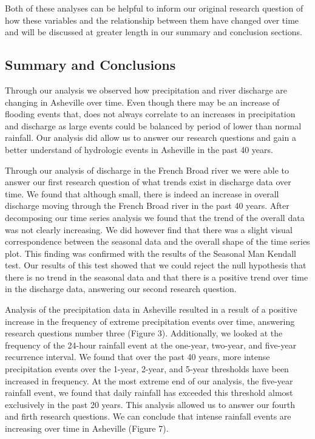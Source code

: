 \documentclass[
]{article}
\begin{document}
Both of these analyses can be helpful to inform our original research
question of how these variables and the relationship between them have
changed over time and will be discussed at greater length in our summary
and conclusion sections.

\newpage

\hypertarget{summary-and-conclusions}{%
\subsection{\texorpdfstring{\textbf{Summary and
Conclusions}}{Summary and Conclusions}}\label{summary-and-conclusions}}

Through our analysis we observed how precipitation and river discharge
are changing in Asheville over time. Even though there may be an
increase of flooding events that, does not always correlate to an
increases in precipitation and discharge as large events could be
balanced by period of lower than normal rainfall. Our analysis did allow
us to answer our research questions and gain a better understand of
hydrologic events in Asheville in the past 40 years.

Through our analysis of discharge in the French Broad river we were able
to answer our first research question of what trends exist in discharge
data over time. We found that although small, there is indeed an
increase in overall discharge moving through the French Broad river in
the past 40 years. After decomposing our time series analysis we found
that the trend of the overall data was not clearly increasing. We did
however find that there was a slight visual correspondence between the
seasonal data and the overall shape of the time series plot. This
finding was confirmed with the results of the Seasonal Man Kendall test.
Our results of this test showed that we could reject the null hypothesis
that there is no trend in the seasonal data and that there is a positive
trend over time in the discharge data, answering our second research
question.

Analysis of the precipitation data in Asheville resulted in a result of
a positive increase in the frequency of extreme precipitation events
over time, answering research questions number three (Figure 3).
Additionally, we looked at the frequency of the 24-hour rainfall event
at the one-year, two-year, and five-year recurrence interval. We found
that over the past 40 years, more intense precipitation events over the
1-year, 2-year, and 5-year thresholds have been increased in frequency.
At the most extreme end of our analysis, the five-year rainfall event,
we found that daily rainfall has exceeded this threshold almost
exclusively in the past 20 years. This analysis allowed us to answer our
fourth and firth research questions. We can conclude that intense
rainfall events are increasing over time in Asheville (Figure 7).
\end{document}
